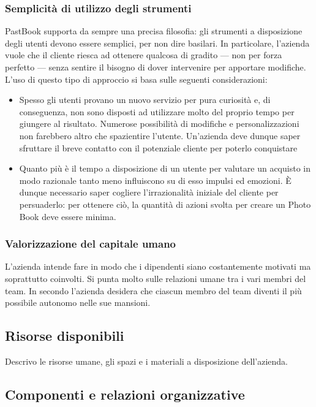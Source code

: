 			\subsubsection{Semplicità di utilizzo degli strumenti}
				PastBook supporta da sempre una precisa filosofia: gli strumenti a disposizione degli utenti devono essere semplici,
				per non dire basilari. In particolare, l'azienda vuole che il cliente riesca ad ottenere qualcosa di gradito — non
				per forza perfetto — senza sentire il bisogno di dover intervenire per apportare modifiche.\\
				L'uso di questo tipo di approccio si basa sulle seguenti considerazioni:
				\begin{itemize}
					\item Spesso gli utenti provano un nuovo servizio per pura curiosità e, di conseguenza, non sono disposti ad
					utilizzare molto del proprio tempo per giungere al risultato. Numerose possibilità di modifiche e
					personalizzazioni non farebbero altro che spazientire l'utente. Un'azienda deve dunque saper sfruttare il
					breve contatto con il potenziale cliente per poterlo conquistare
					\item Quanto più è il tempo a disposizione di un utente per valutare un acquisto in modo razionale tanto
					meno influiscono su di esso impulsi ed emozioni. È dunque necessario saper cogliere l'irrazionalità iniziale
					del cliente per persuaderlo: per ottenere ciò, la quantità di azioni svolta per creare un Photo Book deve
					essere minima.
				\end{itemize}
			\subsubsection{Valorizzazione del capitale umano}
				L'azienda intende fare in modo che i dipendenti siano costantemente motivati ma soprattutto coinvolti. Si punta
				molto sulle relazioni umane tra i vari membri del team. In secondo l'azienda desidera che ciascun membro del team
				diventi il più possibile autonomo nelle sue mansioni.
		\subsection{Risorse disponibili}
			Descrivo le risorse umane, gli spazi e i materiali a disposizione dell'azienda.
		\subsection{Componenti e relazioni organizzative}
